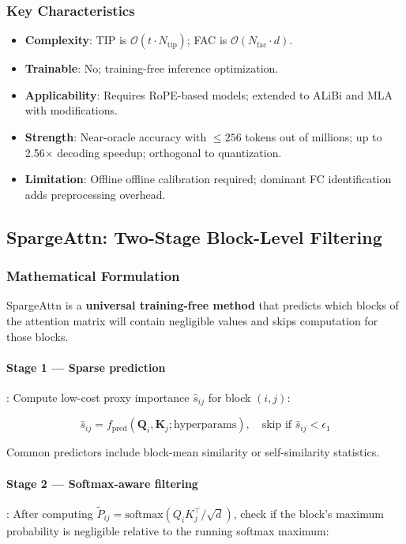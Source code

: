 \subsubsection{Key Characteristics}

\begin{itemize}[leftmargin=*]
    \item \textbf{Complexity}: TIP is $\mathcal{O}(t \cdot N_{\text{tip}})$; FAC is $\mathcal{O}(N_{\text{fac}} \cdot d)$.
    \item \textbf{Trainable}: No; training-free inference optimization.
    \item \textbf{Applicability}: Requires RoPE-based models; extended to ALiBi and MLA with modifications.
    \item \textbf{Strength}: Near-oracle accuracy with $\leq 256$ tokens out of millions; up to 2.56$\times$ decoding speedup; orthogonal to quantization.
    \item \textbf{Limitation}: Offline offline calibration required; dominant FC identification adds preprocessing overhead.
\end{itemize}

\subsection{SpargeAttn: Two-Stage Block-Level Filtering}

\subsubsection{Mathematical Formulation}

SpargeAttn \citep{zhang_spargeattn_2025} is a \textbf{universal training-free method} that predicts which blocks of the attention matrix will contain negligible values and skips computation for those blocks.

\paragraph{Stage 1 --- Sparse prediction}: Compute low-cost proxy importance $\hat{s}_{ij}$ for block $(i,j)$:

\[
\hat{s}_{ij} = f_{\text{pred}}(\mathbf{Q}_i, \mathbf{K}_j; \text{hyperparams}), \quad \text{skip if } \hat{s}_{ij} < \epsilon_1
\]

Common predictors include block-mean similarity or self-similarity statistics.

\paragraph{Stage 2 --- Softmax-aware filtering}: After computing $\tilde{P}_{ij} = \text{softmax}(Q_i K_j^\top/\sqrt{d})$, check if the block's maximum probability is negligible relative to the running softmax maximum:

